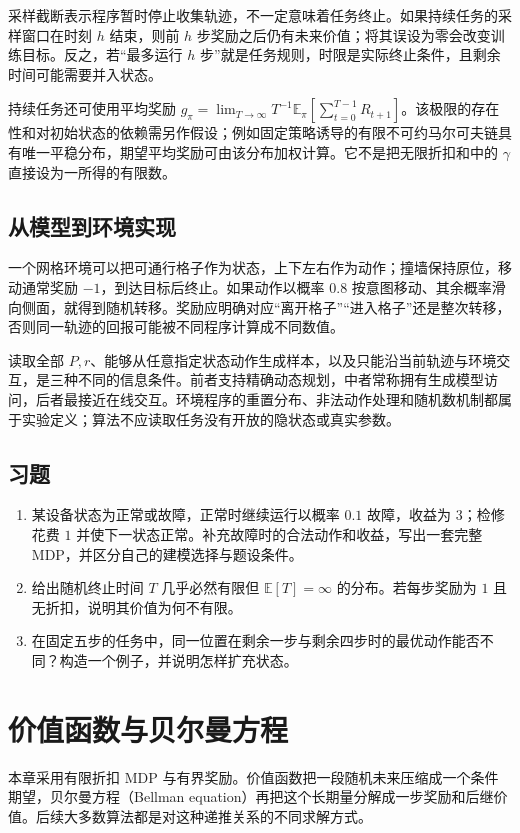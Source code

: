 \documentclass[UTF8,12pt,a4paper,fontset=fandol]{ctexbook}
\begin{document}
采样截断表示程序暂时停止收集轨迹，不一定意味着任务终止。如果持续任务的采样窗口在时刻 $h$ 结束，则前 $h$ 步奖励之后仍有未来价值；将其误设为零会改变训练目标。反之，若“最多运行 $h$ 步”就是任务规则，时限是实际终止条件，且剩余时间可能需要并入状态。

持续任务还可使用平均奖励 $g_\pi=\lim_{T\to\infty}T^{-1}\mathbb E_\pi[\sum_{t=0}^{T-1}R_{t+1}]$。该极限的存在性和对初始状态的依赖需另作假设；例如固定策略诱导的有限不可约马尔可夫链具有唯一平稳分布，期望平均奖励可由该分布加权计算。它不是把无限折扣和中的 $\gamma$ 直接设为一所得的有限数。

\section{从模型到环境实现}

一个网格环境可以把可通行格子作为状态，上下左右作为动作；撞墙保持原位，移动通常奖励 $-1$，到达目标后终止。如果动作以概率 $0.8$ 按意图移动、其余概率滑向侧面，就得到随机转移。奖励应明确对应“离开格子”“进入格子”还是整次转移，否则同一轨迹的回报可能被不同程序计算成不同数值。

读取全部 $P,r$、能够从任意指定状态动作生成样本，以及只能沿当前轨迹与环境交互，是三种不同的信息条件。前者支持精确动态规划，中者常称拥有生成模型访问，后者最接近在线交互。环境程序的重置分布、非法动作处理和随机数机制都属于实验定义；算法不应读取任务没有开放的隐状态或真实参数。

\section{习题}
\begin{enumerate}
\item 某设备状态为正常或故障，正常时继续运行以概率 $0.1$ 故障，收益为 $3$；检修花费 $1$ 并使下一状态正常。补充故障时的合法动作和收益，写出一套完整 MDP，并区分自己的建模选择与题设条件。
\item 给出随机终止时间 $T$ 几乎必然有限但 $\mathbb E[T]=\infty$ 的分布。若每步奖励为 $1$ 且无折扣，说明其价值为何不有限。
\item 在固定五步的任务中，同一位置在剩余一步与剩余四步时的最优动作能否不同？构造一个例子，并说明怎样扩充状态。
\end{enumerate}

\chapter{价值函数与贝尔曼方程}
\label{ch:rl-bellman}

本章采用有限折扣 MDP 与有界奖励。价值函数把一段随机未来压缩成一个条件期望，贝尔曼方程（Bellman equation）再把这个长期量分解成一步奖励和后继价值。后续大多数算法都是对这种递推关系的不同求解方式。
\end{document}
